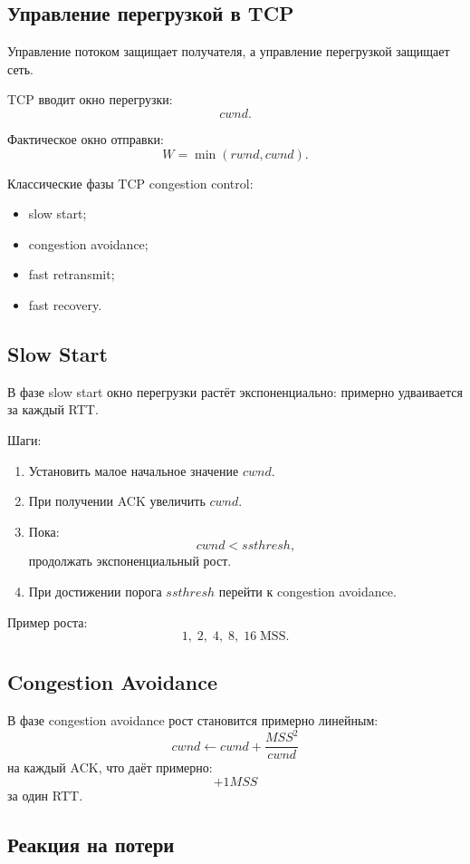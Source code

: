 \documentclass[12pt,a4paper]{article}
\begin{document}
\subsection{Управление перегрузкой в TCP}

Управление потоком защищает получателя, а управление перегрузкой защищает сеть.

TCP вводит окно перегрузки:
\[
cwnd.
\]

Фактическое окно отправки:
\[
W = \min(rwnd, cwnd).
\]

Классические фазы TCP congestion control:
\begin{itemize}
    \item slow start;
    \item congestion avoidance;
    \item fast retransmit;
    \item fast recovery.
\end{itemize}

\subsection{Slow Start}

В фазе slow start окно перегрузки растёт экспоненциально: примерно удваивается за каждый RTT.

Шаги:
\begin{enumerate}
    \item Установить малое начальное значение $cwnd$.
    \item При получении ACK увеличить $cwnd$.
    \item Пока:
    \[
    cwnd < ssthresh,
    \]
    продолжать экспоненциальный рост.
    \item При достижении порога $ssthresh$ перейти к congestion avoidance.
\end{enumerate}

Пример роста:
\[
1,\;2,\;4,\;8,\;16\;\text{MSS}.
\]

\subsection{Congestion Avoidance}

В фазе congestion avoidance рост становится примерно линейным:
\[
cwnd \leftarrow cwnd + \frac{MSS^2}{cwnd}
\]
на каждый ACK, что даёт примерно:
\[
+1 MSS
\]
за один RTT.

\subsection{Реакция на потери}
\end{document}
